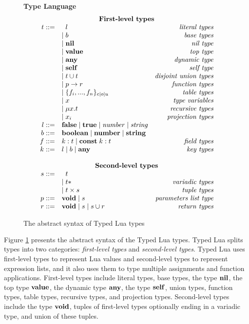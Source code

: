 \begin{figure}[!ht]
\textbf{Type Language}\\
\dstart
$$
\begin{array}{rlr}
\multicolumn{3}{c}{\textbf{First-level types}}\\
t ::= & \;\; l & \textit{literal types}\\
& | \; b & \textit{base types}\\
& | \; \Nil & \textit{nil type}\\
& | \; \Value & \textit{top type}\\
& | \; \Any & \textit{dynamic type}\\
& | \; \Self & \textit{self type}\\
& | \; t \cup t & \textit{disjoint union types}\\
& | \; p \rightarrow r & \textit{function types}\\
& | \; \{f_{i}, ..., f_{n}\}_{c|o|u} & \textit{table types}\\
& | \; x & \textit{type variables}\\
& | \; \mu x.t & \textit{recursive types}\\
& | \; x_{i} & \textit{projection types}\\
l ::= & \False \; | \; \True \; | \; {\it number} \; | \; {\it string} & \\
b ::= & \Boolean \; | \; \Number \; | \; \String & \\
f ::= & k:t \; | \; \Const \; k:t & \textit{field types}\\ 
k ::= & l \; | \; b \; | \; \Any & \textit{key types}\\
\multicolumn{3}{c}{}\\
\multicolumn{3}{c}{\textbf{Second-level types}}\\
s ::= & \;\; t &\\
& | \; t* & \textit{variadic types}\\
& | \; t \times s & \textit{tuple types}\\
p ::= & \Void \; | \; s & \textit{parameters list type}\\
r ::= & \Void \; | \; s \; | \; s \cup r & \textit{return types}\\
\end{array}
$$
\dend
\caption{The abstract syntax of Typed Lua types}
\label{fig:typelang}
\end{figure}

Figure \ref{fig:typelang} presents the abstract syntax of the
Typed Lua types.
Typed Lua splits types into two categories:
\emph{first-level types} and \emph{second-level types}.
Typed Lua uses first-level types to represent Lua values and
second-level types to represent expression lists, and it also
uses them to type multiple assignments and function applications.
First-level types include literal types, base types, the type $\mathbf{nil}$,
the top type $\mathbf{value}$, the dynamic type $\mathbf{any}$, the type $\mathbf{self}$,
union types, function types, table types, recursive types, and
projection types.
Second-level types include the type $\mathbf{void}$, tuples of first-level
types optionally ending in a variadic type, and union of these tuples.

